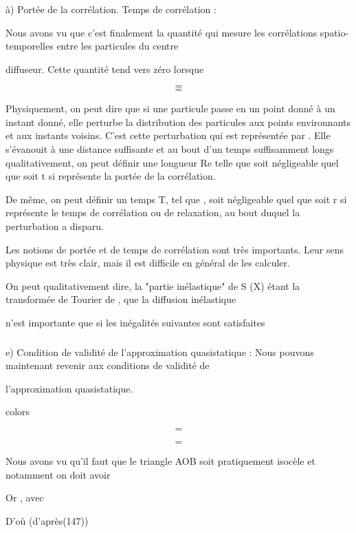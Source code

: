 \subsubsection{}%
à) Portée de la corrélation. Temps de corrélation :

Nous avons vu que c'est finalement la quantité  qui
mesure les corrélations spatio-temporelles entre les particules du centre

diffuseur. Cette quantité tend vers zéro lorsque

\[
\tag{146}=
\]
\[
\tag{147}=
\]

Physiquement, on peut dire que si une particule passe en un
point donné à un instant donné, elle perturbe la distribution des particules
aux points environnants et aux instants voisins. C'est cette perturbation qui
est représentée par . Elle s'évanouit à une distance suffisante et
au bout d'un temps suffisamment longs qualitativement, on peut définir une
longueur Re telle que  soit négligeable quel que soit t si
 représente la portée de la corrélation.

De même, on peut définir un temps T, tel que ,  soit
négligeable quel que soit r si  représente le temps de corrélation ou de relaxation,
au bout duquel la perturbation a disparu.

Les notions de portée et de temps de corrélation sont très importants. Leur sens
physique est très clair, mais il est difficile en général
de les calculer.

On peut qualitativement dire, la "partie inélastique" de S (X)
étant la transformée de Tourier de , que la diffusion inélastique

n'est importante que si les inégalités suivantes sont satisfaites

\subsubsection{}%
e) Condition de validité de l'approximation quasistatique :
Nous pouvons maintenant revenir aux conditions de validité de

l'approximation quasistatique.

colors


\[
\tag{148}=
\]

\[
\tag{149}=
\]

Nous avons vu qu'il faut que le triangle AOB soit pratiquement isocèle et
notamment on doit avoir

Or , avec 

D'où  (d'après(147))

